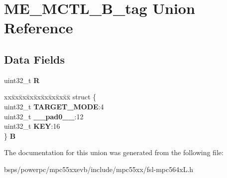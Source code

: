 \hypertarget{unionME__MCTL__32B__tag}{}\section{M\+E\+\_\+\+M\+C\+T\+L\+\_\+B\+\_\+tag Union Reference}
\label{unionME__MCTL__32B__tag}
\subsection*{Data Fields}
\begin{DoxyCompactItemize}
\item 
\mbox{\label{unionME__MCTL__32B__tag_a4a1dab2e57aaddd511b9686c025e945b}} 
uint32\+\_\+t {\bfseries R}
\item 
\mbox{\label{unionME__MCTL__32B__tag_a0908dea053ab48cfa5ce26bc1f0bb933}} 
\begin{tabbing}
xx\=xx\=xx\=xx\=xx\=xx\=xx\=xx\=xx\=\kill
struct \{\\
\>uint32\_t {\bfseries TARGET\_MODE}:4\\
\>uint32\_t {\bfseries \_\_pad0\_\_}:12\\
\>uint32\_t {\bfseries KEY}:16\\
\} {\bfseries B}\\

\end{tabbing}\end{DoxyCompactItemize}


The documentation for this union was generated from the following file\+:\begin{DoxyCompactItemize}
\item 
bsps/powerpc/mpc55xxevb/include/mpc55xx/fsl-\/mpc564x\+L.\+h\end{DoxyCompactItemize}
